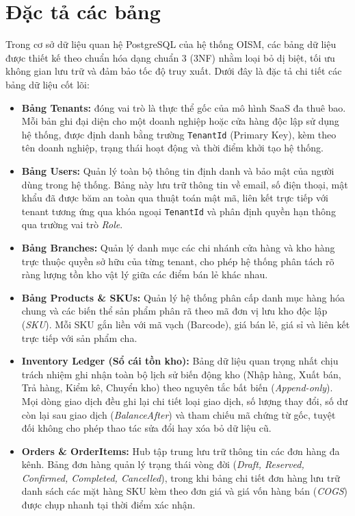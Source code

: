 \documentclass[12pt,a4paper]{report}
\begin{document}
	\section{Đặc tả các bảng}
	Trong cơ sở dữ liệu quan hệ PostgreSQL của hệ thống OISM, các bảng dữ liệu được thiết kế theo chuẩn hóa dạng chuẩn 3 (3NF) nhằm loại bỏ dị biệt, tối ưu không gian lưu trữ và đảm bảo tốc độ truy xuất. Dưới đây là đặc tả chi tiết các bảng dữ liệu cốt lõi:
	\par
	\begin{itemize}
		\item \textbf{Bảng Tenants:} đóng vai trò là thực thể gốc của mô hình SaaS đa thuê bao. Mỗi bản ghi đại diện cho một doanh nghiệp hoặc cửa hàng độc lập sử dụng hệ thống, được định danh bằng trường \texttt{TenantId} (Primary Key), kèm theo tên doanh nghiệp, trạng thái hoạt động và thời điểm khởi tạo hệ thống.
		\item \textbf{Bảng Users:} Quản lý toàn bộ thông tin định danh và bảo mật của người dùng trong hệ thống. Bảng này lưu trữ thông tin về email, số điện thoại, mật khẩu đã được băm an toàn qua thuật toán mật mã, liên kết trực tiếp với tenant tương ứng qua khóa ngoại \texttt{TenantId} và phân định quyền hạn thông qua trường vai trò \textit{Role}.
		\item \textbf{Bảng Branches:} Quản lý danh mục các chi nhánh cửa hàng và kho hàng trực thuộc quyền sở hữu của từng tenant, cho phép hệ thống phân tách rõ ràng lượng tồn kho vật lý giữa các điểm bán lẻ khác nhau.
		\item \textbf{Bảng Products \& SKUs:} Quản lý hệ thống phân cấp danh mục hàng hóa chung và các biến thể sản phẩm phân rã theo mã đơn vị lưu kho độc lập (\textit{SKU}). Mỗi SKU gắn liền với mã vạch (Barcode), giá bán lẻ, giá sỉ và liên kết trực tiếp với sản phẩm cha.
		\item \textbf{Inventory Ledger (Sổ cái tồn kho):} Bảng dữ liệu quan trọng nhất chịu trách nhiệm ghi nhận toàn bộ lịch sử biến động kho (Nhập hàng, Xuất bán, Trả hàng, Kiểm kê, Chuyển kho) theo nguyên tắc bất biến (\textit{Append-only}). Mọi dòng giao dịch đều ghi lại chi tiết loại giao dịch, số lượng thay đổi, số dư còn lại sau giao dịch (\textit{BalanceAfter}) và tham chiếu mã chứng từ gốc, tuyệt đối không cho phép thao tác sửa đổi hay xóa bỏ dữ liệu cũ.
		\item \textbf{Orders \& OrderItems:} Hub tập trung lưu trữ thông tin các đơn hàng đa kênh. Bảng đơn hàng quản lý trạng thái vòng đời (\textit{Draft, Reserved, Confirmed, Completed, Cancelled}), trong khi bảng chi tiết đơn hàng lưu trữ danh sách các mặt hàng SKU kèm theo đơn giá và giá vốn hàng bán (\textit{COGS}) được chụp nhanh tại thời điểm xác nhận.
	\end{itemize}
	
\end{document}
